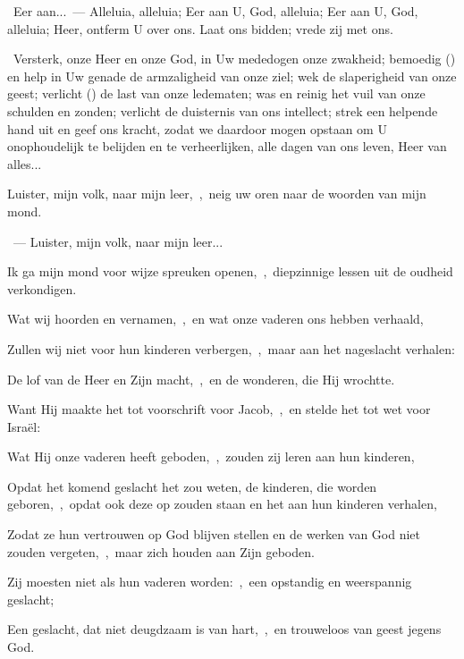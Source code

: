 \documentclass[12pt,twoside,a5paper]{article}
\begin{document}
\begin{halfparskip}
  \dd~Eer aan...~--- Alleluia, alleluia; Eer aan U, God, alleluia; Eer aan U, God, alleluia; Heer, ontferm U over ons. Laat ons bidden; vrede zij met ons.

  \cc~Versterk, onze Heer en onze God, in Uw mededogen onze zwakheid; bemoedig () en help in Uw genade de armzaligheid van onze ziel; wek de slaperigheid van onze geest; verlicht () de last van onze ledematen; was en reinig het vuil van onze schulden en zonden; verlicht de duisternis van ons intellect; strek een helpende hand uit en geef ons kracht, zodat we daardoor mogen opstaan om U onophoudelijk te belijden en te verheerlijken, alle dagen van ons leven, Heer van alles...
\end{halfparskip}



\begin{halfparskip}

  Luister, mijn volk, naar mijn leer,~\sep\ neig uw oren naar de woorden van mijn mond.

  ~---  Luister, mijn volk, naar mijn leer...

  Ik ga mijn mond voor wijze spreuken openen,~\sep\ diepzinnige lessen uit de oudheid verkondigen.

  Wat wij hoorden en vernamen,~\sep\ en wat onze vaderen ons hebben verhaald,

  Zullen wij niet voor hun kinderen verbergen,~\sep\ maar aan het nageslacht verhalen:

  De lof van de Heer en Zijn macht,~\sep\ en de wonderen, die Hij wrochtte.

  Want Hij maakte het tot voorschrift voor Jacob,~\sep\ en stelde het tot wet voor Israël:

  Wat Hij onze vaderen heeft geboden,~\sep\ zouden zij leren aan hun kinderen,

  Opdat het komend geslacht het zou weten, de kinderen, die worden geboren,~\sep\ opdat ook deze op zouden staan en het aan hun kinderen verhalen,

  Zodat ze hun vertrouwen op God blijven stellen en de werken van God niet zouden vergeten,~\sep\ maar zich houden aan Zijn geboden.

  Zij moesten niet als hun vaderen worden:~\sep\ een opstandig en weerspannig geslacht;

  Een geslacht, dat niet deugdzaam is van hart,~\sep\ en trouweloos van geest jegens God.
\end{halfparskip}
\end{document}
